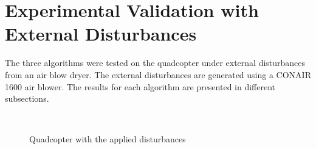 \documentclass[letterpaper%
, twoside%
, 12pt%
,memoire%
, english%
,creativecommons,hyperref%
]{thETS}
\begin{document}
\section{Experimental Validation with External Disturbances}
The three algorithms were tested on the quadcopter under external disturbances from an air blow dryer. The external disturbances are generated using a CONAIR 1600 air blower. The results for each algorithm are presented in different subsections.
\begin{figure}[H]
	\centering
	 \\ \parbox{0.75\textwidth}{\caption{{Quadcopter with the applied disturbances \label{Fig:dryer}}}}
\end{figure}
\end{document}
